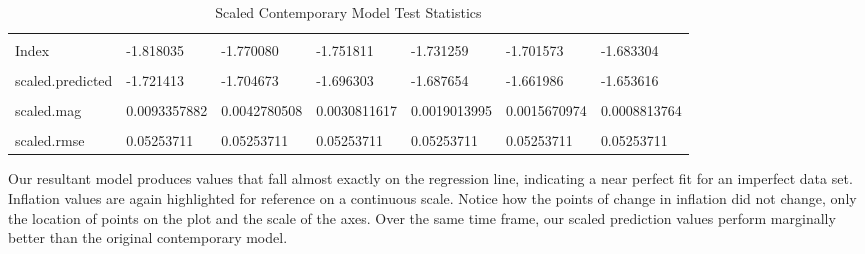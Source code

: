 \documentclass[
]{article}
\begin{document}
\begin{table}[!h]

\caption{\label{tab:unnamed-chunk-11}Scaled Contemporary Model Test Statistics}
\centering
\begin{tabular}[t]{lllllll}
\toprule
\cellcolor{gray!6}{Date} & \cellcolor{gray!6}{1980-02-01} & \cellcolor{gray!6}{1980-04-01} & \cellcolor{gray!6}{1980-05-01} & \cellcolor{gray!6}{1980-06-01} & \cellcolor{gray!6}{1980-09-01} & \cellcolor{gray!6}{1980-10-01}\\
Index & -1.818035 & -1.770080 & -1.751811 & -1.731259 & -1.701573 & -1.683304\\
\cellcolor{gray!6}{Inflation} & \cellcolor{gray!6}{1.41} & \cellcolor{gray!6}{1.12} & \cellcolor{gray!6}{0.99} & \cellcolor{gray!6}{1.10} & \cellcolor{gray!6}{0.84} & \cellcolor{gray!6}{0.95}\\
scaled.predicted & -1.721413 & -1.704673 & -1.696303 & -1.687654 & -1.661986 & -1.653616\\
\cellcolor{gray!6}{scaled.error} & \cellcolor{gray!6}{-0.09662188} & \cellcolor{gray!6}{-0.06540681} & \cellcolor{gray!6}{-0.05550821} & \cellcolor{gray!6}{-0.04360504} & \cellcolor{gray!6}{-0.03958658} & \cellcolor{gray!6}{-0.02968798}\\
\addlinespace
scaled.mag & 0.0093357882 & 0.0042780508 & 0.0030811617 & 0.0019013995 & 0.0015670974 & 0.0008813764\\
\cellcolor{gray!6}{scaled.eravg} & \cellcolor{gray!6}{0.002760148} & \cellcolor{gray!6}{0.002760148} & \cellcolor{gray!6}{0.002760148} & \cellcolor{gray!6}{0.002760148} & \cellcolor{gray!6}{0.002760148} & \cellcolor{gray!6}{0.002760148}\\
scaled.rmse & 0.05253711 & 0.05253711 & 0.05253711 & 0.05253711 & 0.05253711 & 0.05253711\\
\bottomrule
\end{tabular}
\end{table}

Our resultant model produces values that fall almost exactly on the
regression line, indicating a near perfect fit for an imperfect data
set. Inflation values are again highlighted for reference on a
continuous scale. Notice how the points of change in inflation did not
change, only the location of points on the plot and the scale of the
axes. Over the same time frame, our scaled prediction values perform
marginally better than the original contemporary model.
\end{document}
